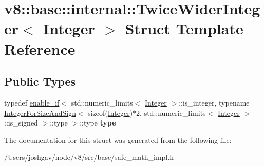 \hypertarget{structv8_1_1base_1_1internal_1_1_twice_wider_integer}{}\section{v8\+:\+:base\+:\+:internal\+:\+:Twice\+Wider\+Integer$<$ Integer $>$ Struct Template Reference}
\label{structv8_1_1base_1_1internal_1_1_twice_wider_integer}
\subsection*{Public Types}
\begin{DoxyCompactItemize}
\item 
typedef \hyperlink{structv8_1_1base_1_1internal_1_1enable__if}{enable\+\_\+if}$<$ std\+::numeric\+\_\+limits$<$ \hyperlink{classv8_1_1_integer}{Integer} $>$\+::is\+\_\+integer, typename \hyperlink{structv8_1_1base_1_1internal_1_1_integer_for_size_and_sign}{Integer\+For\+Size\+And\+Sign}$<$ sizeof(\hyperlink{classv8_1_1_integer}{Integer})$\ast$2, std\+::numeric\+\_\+limits$<$ \hyperlink{classv8_1_1_integer}{Integer} $>$\+::is\+\_\+signed $>$\+::type $>$\+::type {\bfseries type}\hypertarget{structv8_1_1base_1_1internal_1_1_twice_wider_integer_a2902f4ec4476399557bd9237c1aaf351}{}\label{structv8_1_1base_1_1internal_1_1_twice_wider_integer_a2902f4ec4476399557bd9237c1aaf351}

\end{DoxyCompactItemize}


The documentation for this struct was generated from the following file\+:\begin{DoxyCompactItemize}
\item 
/\+Users/joshgav/node/v8/src/base/safe\+\_\+math\+\_\+impl.\+h\end{DoxyCompactItemize}
